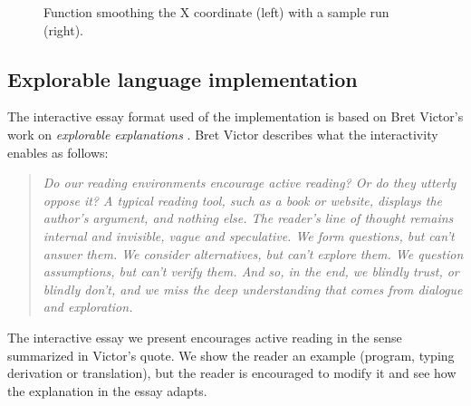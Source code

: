\begin{figure}[t]
\caption{Function smoothing the X coordinate (left) with a sample run (right).}
\label{fig:essay-df}
\end{figure}


\subsection{Explorable language implementation}
\label{sec:impl-essay-features}

The interactive essay format used of the implementation is based on Bret Victor's work on
\emph{explorable explanations} \cite{essay-explorable}. Bret Victor describes what the interactivity
enables as follows:
%
\begin{quote}
\emph{Do our reading environments encourage active reading? Or do they utterly oppose it? A
  typical reading tool, such as a book or website, displays the author's argument, and nothing
  else. The reader's line of thought remains internal and invisible, vague and speculative. We
  form questions, but can't answer them. We consider alternatives, but can't explore them. We
  question assumptions, but can't verify them. And so, in the end, we blindly trust, or blindly
  don't, and we miss the deep understanding that comes from dialogue and exploration.}
\end{quote}
%
The interactive essay we present encourages active reading in the sense summarized in Victor's quote.
We show the reader an example (program, typing derivation or translation), but the reader is
encouraged to modify it and see how the explanation in the essay adapts.

